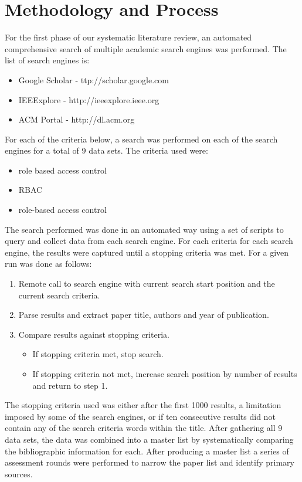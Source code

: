 \section{Methodology and Process} \label{sec:process}

For the first phase of our systematic literature review, an automated comprehensive search of multiple academic search engines was performed. The list of search engines is:

\begin{itemize}
  \item Google Scholar - ttp://scholar.google.com
  \item IEEExplore - http://ieeexplore.ieee.org
  \item ACM Portal - http://dl.acm.org
\end{itemize}

For each of the criteria below, a search was performed on each of the search engines for a total of 9 data sets.  The criteria used were:

\begin{itemize}
  \item role based access control
  \item RBAC
  \item role-based access control
\end{itemize}

The search performed was done in an automated way using a set of scripts to query and collect data from each search engine.  For each criteria for each search engine, the results were captured until a stopping criteria was met.  For a given run was done as follows:

\begin{enumerate}
  \item Remote call to search engine with current search start position and the current search criteria.
  \item Parse results and extract paper title, authors and year of publication.
  \item Compare results against stopping criteria.
    \begin{itemize}
      \item If stopping criteria met, stop search.
      \item If stopping criteria not met, increase search position by number of results and return to step 1.
    \end{itemize}
\end{enumerate}

The stopping criteria used was either after the first 1000 results, a limitation imposed by some of the search engines, or if ten consecutive results did not contain any of the search criteria words within the title.  After gathering all 9 data sets, the data was combined into a master list by systematically comparing the bibliographic information for each.  After producing a master list a series of assessment rounds were performed to narrow the paper list and identify primary sources.  

